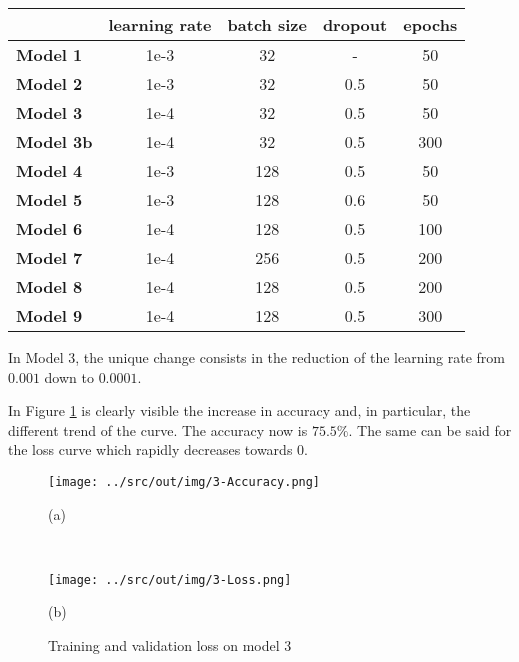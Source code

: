 \documentclass[a4paper,12pt]{article} %
\begin{document}
	\begin{table}[H]
		\centering
		\begin{tabular}{l@{\hspace{.5cm}}cccc}
			\toprule
			& \textbf{learning rate} & \textbf{batch size} & \textbf{dropout} & 
			\textbf{epochs} \\
			\midrule
			\textbf{Model 1} & {1e-3} & {32}  &  -  & 50\\
			\textbf{Model 2} & {1e-3} & {32}  & 0.5 & 50\\
			\textbf{Model 3} & {1e-4} & {32}  & 0.5 & 50 \\
			\textbf{Model 3b} & {1e-4} & {32} & 0.5 & 300 \\
			\textbf{Model 4} & {1e-3} & {128} & 0.5 & 50 \\
			\textbf{Model 5} & {1e-3} & {128} & 0.6 & 50 \\
			\textbf{Model 6} & {1e-4} & {128} & 0.5 & 100 \\
			\textbf{Model 7} & {1e-4} & {256} & 0.5 & 200 \\
			\textbf{Model 8} & {1e-4} & {128} & 0.5 & 200 \\
			\textbf{Model 9} & {1e-4} & {128} & 0.5 & 300 \\
			\bottomrule 
		\end{tabular}
		\label{tab:param}
	\end{table}

	In Model 3, the unique change consists in the reduction of the learning 
	rate from $0.001$ down to $0.0001$. 
	
	In Figure \ref{fig:model3-performance} is clearly visible the increase 
	in accuracy and, in particular, the different trend of the curve. The 
	accuracy now is $75.5\%$.
	The same can be said for the loss curve which rapidly decreases towards $0$.
	
	\begin{figure}[htb]
		\begin{minipage}[c]{.49\textwidth}
			\centering
			\texttt{[image: ../src/out/img/3-Accuracy.png]}
			\caption*{(a)}
		\end{minipage}
		~
		\begin{minipage}[c]{.49\textwidth}
			\centering
			\texttt{[image: ../src/out/img/3-Loss.png]}
			\caption*{(b)}
		\end{minipage}
		\caption{Training and validation loss on model 3}
		\label{fig:model3-performance}
	\end{figure}
\end{document}
